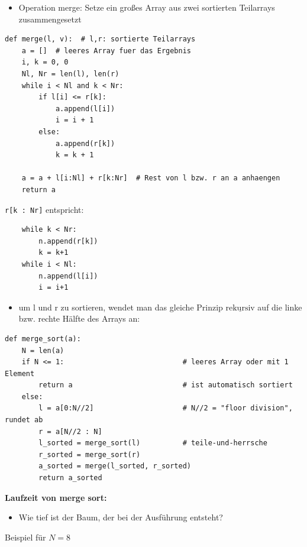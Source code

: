 \documentclass[11pt, fleqn]{scrreprt}
\begin{document}
    \begin{itemize}
        \item Operation merge: Setze ein großes Array aus zwei sortierten Teilarrays zusammengesetzt
    \end{itemize}

    \begin{verbatim}
def merge(l, v):  # l,r: sortierte Teilarrays
    a = []  # leeres Array fuer das Ergebnis
    i, k = 0, 0
    Nl, Nr = len(l), len(r)
    while i < Nl and k < Nr:
        if l[i] <= r[k]:
            a.append(l[i])
            i = i + 1
        else:
            a.append(r[k])
            k = k + 1

    a = a + l[i:Nl] + r[k:Nr]  # Rest von l bzw. r an a anhaengen
    return a
    \end{verbatim}


    \verb|r[k : Nr]| entspricht: \\
    \begin{verbatim}
    while k < Nr:
        n.append(r[k])
        k = k+1
    while i < Nl:
        n.append(l[i])
        i = i+1
    \end{verbatim}


    \begin{itemize}
        \item um l und r zu sortieren, wendet man das gleiche Prinzip $\underline{\text{rekursiv}}$ auf die linke bzw. rechte Hälfte des Arrays an:
    \end{itemize}

    \begin{verbatim}
def merge_sort(a):
    N = len(a)
    if N <= 1:                            # leeres Array oder mit 1 Element
        return a                          # ist automatisch sortiert
    else:
        l = a[0:N//2]                     # N//2 = "floor division", rundet ab
        r = a[N//2 : N]
        l_sorted = merge_sort(l)          # teile-und-herrsche
        r_sorted = merge_sort(r)
        a_sorted = merge(l_sorted, r_sorted)
        return a_sorted
    \end{verbatim}

        \textbf{Laufzeit von merge sort:} \\
        \begin{itemize}
            \item Wie tief ist der Baum, der bei der Ausführung entsteht?
        \end{itemize}

        Beispiel für $N=8$
\end{document}

